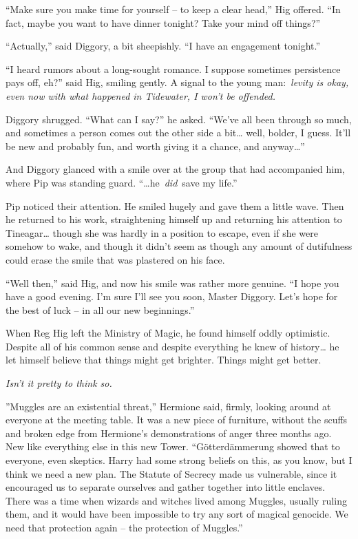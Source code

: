 ``Make sure you make time for yourself -- to keep a clear head,'' Hig
offered. ``In fact, maybe you want to have dinner tonight? Take your
mind off things?''

``Actually,'' said Diggory, a bit sheepishly. ``I have an engagement
tonight.''

``I heard rumors about a long-sought romance. I suppose sometimes
persistence pays off, eh?'' said Hig, smiling gently. A signal to the
young man:~\emph{levity is okay, even now with what happened in
Tidewater, I won't be offended.}

Diggory shrugged. ``What can I say?'' he asked. ``We've all been through
so much, and sometimes a person comes out the other side a bit\ldots{}
well, bolder, I guess. It'll be new and probably fun, and worth giving
it a chance, and anyway\ldots{}''

And Diggory glanced with a smile over at the group that had accompanied
him, where Pip was standing guard. ``\ldots he~\emph{did}~save my
life.''

Pip noticed their attention. He smiled hugely and gave them a little
wave. Then he returned to his work, straightening himself up and
returning his attention to Tineagar\ldots{} though she was hardly in a
position to escape, even if she were somehow to wake, and though it
didn't seem as though any amount of dutifulness could erase the smile
that was plastered on his face.

``Well then,'' said Hig, and now his smile was rather more genuine. ``I
hope you have a good evening. I'm sure I'll see you soon, Master
Diggory. Let's hope for the best of luck -- in all our new beginnings.''

When Reg Hig left the Ministry of Magic, he found himself oddly
optimistic. Despite all of his common sense and despite everything he
knew of history\ldots{} he let himself believe that things might get
brighter. Things might get better.

\emph{Isn't it pretty to think so.}

\mybreak

''Muggles are an existential threat,'' Hermione said, firmly, looking
around at everyone at the meeting table. It was a new piece of
furniture, without the scuffs and broken edge from Hermione's
demonstrations of anger three months ago. New like everything else in
this new Tower. ``Götterdämmerung showed that to everyone, even
skeptics. Harry had some strong beliefs on this, as you know, but I
think we need a new plan. The Statute of Secrecy made us vulnerable,
since it encouraged us to separate ourselves and gather together into
little enclaves. There was a time when wizards and witches lived among
Muggles, usually ruling them, and it would have been impossible to try
any sort of magical genocide. We need that protection again -- the
protection of Muggles.''

